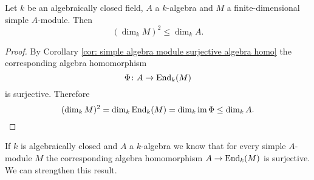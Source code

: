 \begin{cor}\label{cor: dimension simple algebra modules}
 Let $k$ be an algebraically closed field, $A$ a $k$-algebra and $M$ a finite-dimensional simple $A$-module. Then
 \[
  (\dim_k M)^2 \leq \dim_k A.
 \]
\end{cor}
\begin{proof}
 By Corollary \ref{cor: simple algebra module surjective algebra homo} the corresponding algebra homomorphism
 \[
  \Phi \colon A \to \operatorname{End}_k(M)
 \]
 is surjective. Therefore
 \[
  (\dim_k M)^2 = \dim_k \operatorname{End}_k(M) = \dim_k \operatorname{im} \Phi \leq \dim_k A.
  \qedhere
 \]
\end{proof}


If $k$ is algebraically closed and $A$ a  $k$-algebra we know that for every simple $A$-module $M$ the corresponding algebra homomorphism $A \to \operatorname{End}_k(M)$ is surjective. We can strengthen this result.



